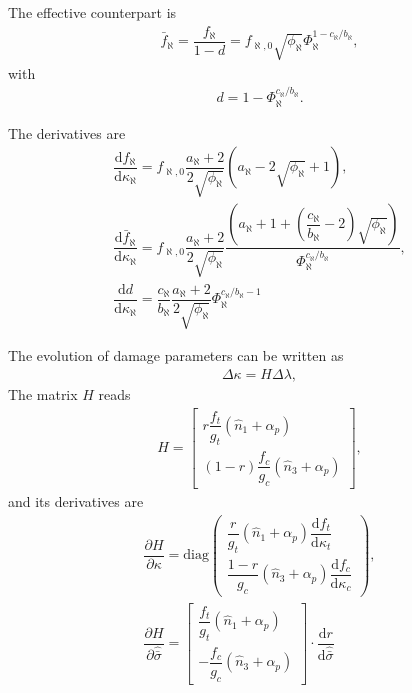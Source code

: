 \documentclass[5p]{elsarticle}
\newcommand*{\md}[1]{\mathrm{d}#1}
\newcommand*{\pdfrac}[2]{\dfrac{\partial#1}{\partial#2}}
\newcommand*{\ddfrac}[2]{\dfrac{\md#1}{\md#2}}
\begin{document}
The effective counterpart is
\begin{gather*}
\bar{f}_\aleph=\dfrac{f_\aleph}{1-d}=f_{\aleph,0}\sqrt{\phi_\aleph}\Phi_\aleph^{1-c_\aleph/b_\aleph},
\end{gather*}
with
\begin{gather*}
d=1-\Phi_\aleph^{c_\aleph/b_\aleph}.
\end{gather*}

The derivatives are
\begin{gather*}
\ddfrac{f_\aleph}{\kappa_\aleph}=f_{\aleph,0}\dfrac{a_\aleph+2}{2\sqrt{\phi_\aleph}}\left(a_\aleph-2\sqrt{\phi_\aleph}+1\right),\\
\ddfrac{\bar{f}_\aleph}{\kappa_\aleph}=f_{\aleph,0}\dfrac{a_\aleph+2}{2\sqrt{\phi_\aleph}}\dfrac{\left(a_\aleph+1+\left(\dfrac{c_\aleph}{b_\aleph}-2\right)\sqrt{\phi_\aleph}\right)}{\Phi_\aleph^{c_\aleph/b_\aleph}},\\
\ddfrac{d}{\kappa_\aleph}=\dfrac{c_\aleph}{b_\aleph}\dfrac{a_\aleph+2}{2\sqrt{\phi_\aleph}}\Phi_\aleph^{c_\aleph/b_\aleph-1}
\end{gather*}

The evolution of damage parameters can be written as
\begin{gather*}
\Delta\kappa=H\Delta\lambda,
\end{gather*}
The matrix $H$ reads
\begin{gather*}
H=\begin{bmatrix}
r\dfrac{f_t}{g_t}\left(\hat{n}_1+\alpha_p\right)\\\left(1-r\right)\dfrac{f_c}{g_c}\left(\hat{n}_3+\alpha_p\right)
\end{bmatrix},
\end{gather*}
and its derivatives are
\begin{gather*}
\pdfrac{H}{\kappa}=\text{diag}\begin{pmatrix}
\dfrac{r}{g_t}\left(\hat{n}_1+\alpha_p\right)\ddfrac{f_t}{\kappa_t}\\[4mm]
\dfrac{1-r}{g_c}\left(\hat{n}_3+\alpha_p\right)\ddfrac{f_c}{\kappa_c}
\end{pmatrix},\\
\pdfrac{H}{\hat{\bar{\sigma}}}=\begin{bmatrix}
\dfrac{f_t}{g_t}\left(\hat{n}_1+\alpha_p\right)\\
-\dfrac{f_c}{g_c}\left(\hat{n}_3+\alpha_p\right)
\end{bmatrix}\cdot\ddfrac{r}{\hat{\bar{\sigma}}}
\end{gather*}
\end{document}

